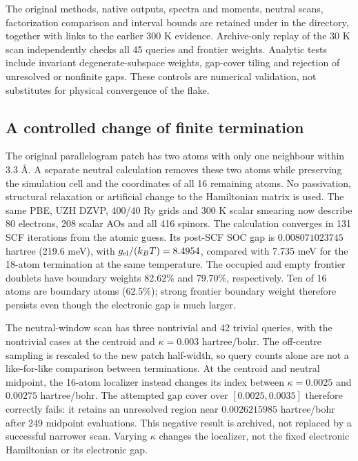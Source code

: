 \documentclass[11pt]{article}
\begin{document}
The original methods, native outputs, spectra and moments, neutral
scans, factorization comparison and interval bounds are retained under
 in the
 directory, together with links
to the earlier 300 K evidence. Archive-only replay of
the 30 K scan independently checks all 45 queries and frontier
weights. Analytic tests include invariant degenerate-subspace
weights, gap-cover tiling and rejection of unresolved or nonfinite
gaps. These controls are numerical validation, not substitutes for
physical convergence of the flake.

\subsection{A controlled change of finite termination}
The original parallelogram patch has two atoms with only one
neighbour within 3.3 \AA. A separate neutral calculation removes
these two atoms while preserving the simulation cell and the
coordinates of all 16 remaining atoms. No passivation, structural
relaxation or artificial change to the Hamiltonian matrix is used.
The same PBE, UZH DZVP, 400/40 Ry grids and 300 K scalar smearing
now describe 80 electrons, 208 scalar AOs and all 416 spinors.
The calculation converges in 131 SCF iterations from the atomic
guess. Its post-SCF SOC gap is $0.008071023745$ hartree
(219.6 meV), with $g_{\rm el}/(k_BT)=8.4954$, compared with
7.735 meV for the 18-atom termination at the same temperature.
The occupied and empty frontier doublets have boundary weights
82.62\% and 79.70\%, respectively. Ten of 16 atoms are boundary
atoms (62.5\%); strong frontier boundary weight therefore persists
even though the electronic gap is much larger.

The neutral-window scan has three nontrivial and 42 trivial
queries, with the nontrivial cases at the centroid and
$\kappa=0.003$ hartree/bohr. The off-centre sampling is rescaled
to the new patch half-width, so query counts alone are not a
like-for-like comparison between terminations. At the centroid
and neutral midpoint, the 16-atom localizer instead changes its
index between $\kappa=0.0025$ and $0.00275$ hartree/bohr.
The attempted gap cover over $[0.0025,0.0035]$ therefore correctly
fails: it retains an unresolved region near
$0.0026215985$ hartree/bohr after 249 midpoint evaluations.
This negative result is archived, not replaced by a successful
narrower scan. Varying $\kappa$ changes the localizer, not the
fixed electronic Hamiltonian or its electronic gap.
\end{document}

